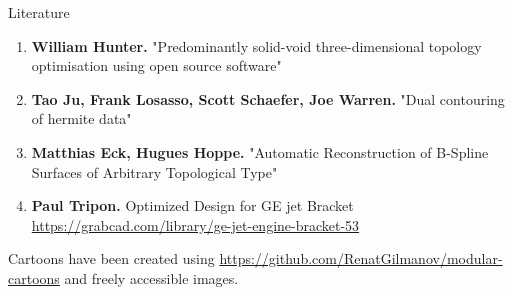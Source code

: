 \begin{frame}{Literature}
\begin{enumerate}
\item \textbf{William Hunter.} "Predominantly solid-void three-dimensional topology optimisation using open source software"
\item \textbf{Tao Ju, Frank Losasso, Scott Schaefer, Joe Warren.} "Dual contouring of hermite data"
\item \textbf{Matthias Eck, Hugues Hoppe.} "Automatic Reconstruction of B-Spline Surfaces of Arbitrary Topological Type"
\item \textbf{Paul Tripon.} Optimized Design for GE jet Bracket \url{https://grabcad.com/library/ge-jet-engine-bracket-53}
\end{enumerate}
Cartoons have been created using \url{https://github.com/RenatGilmanov/modular-cartoons} and freely accessible images.
\end{frame}
